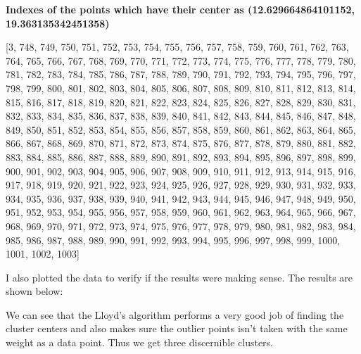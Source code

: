 \documentclass[11pt]{article}
\begin{document}
\begin{itemize}
\textbf{Indexes of the points which have their center as  (12.629664864101152, 19.363135342451358)}

[3, 748, 749, 750, 751, 752, 753, 754, 755, 756, 757, 758, 759, 760, 761, 762, 763, 764, 765, 766, 767, 768, 769, 770, 771, 772, 773, 774, 775, 776, 777, 778, 779, 780, 781, 782, 783, 784, 785, 786, 787, 788, 789, 790, 791, 792, 793, 794, 795, 796, 797, 798, 799, 800, 801, 802, 803, 804, 805, 806, 807, 808, 809, 810, 811, 812, 813, 814, 815, 816, 817, 818, 819, 820, 821, 822, 823, 824, 825, 826, 827, 828, 829, 830, 831, 832, 833, 834, 835, 836, 837, 838, 839, 840, 841, 842, 843, 844, 845, 846, 847, 848, 849, 850, 851, 852, 853, 854, 855, 856, 857, 858, 859, 860, 861, 862, 863, 864, 865, 866, 867, 868, 869, 870, 871, 872, 873, 874, 875, 876, 877, 878, 879, 880, 881, 882, 883, 884, 885, 886, 887, 888, 889, 890, 891, 892, 893, 894, 895, 896, 897, 898, 899, 900, 901, 902, 903, 904, 905, 906, 907, 908, 909, 910, 911, 912, 913, 914, 915, 916, 917, 918, 919, 920, 921, 922, 923, 924, 925, 926, 927, 928, 929, 930, 931, 932, 933, 934, 935, 936, 937, 938, 939, 940, 941, 942, 943, 944, 945, 946, 947, 948, 949, 950, 951, 952, 953, 954, 955, 956, 957, 958, 959, 960, 961, 962, 963, 964, 965, 966, 967, 968, 969, 970, 971, 972, 973, 974, 975, 976, 977, 978, 979, 980, 981, 982, 983, 984, 985, 986, 987, 988, 989, 990, 991, 992, 993, 994, 995, 996, 997, 998, 999, 1000, 1001, 1002, 1003]


I also plotted the data to verify if the results were making sense. The results are shown below:

\begin{figure}[H]%
	\centering
	\qquad
\end{figure}	

We can see that the Lloyd's algorithm performs a very good job of finding the cluster centers and also makes sure the outlier points isn't taken with the same weight as a data point. Thus we get three discernible clusters.



\end{itemize}
\end{document}
